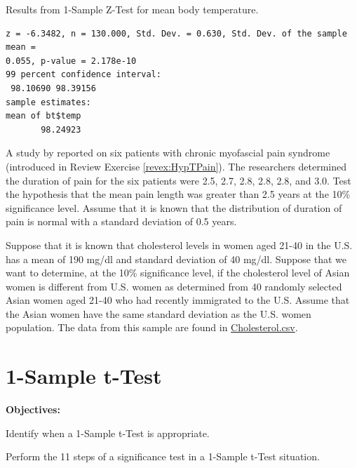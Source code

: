 \documentclass[10pt,openany]{book}\usepackage[]{graphicx}\usepackage[]{color}
\makeatletter
\newenvironment{kframe}{%
 \def\at@end@of@kframe{}%
 \ifinner\ifhmode%
  \def\at@end@of@kframe{\end{minipage}}%
  \begin{minipage}{\columnwidth}%
 \fi\fi%
 \def\FrameCommand##1{\hskip\@totalleftmargin \hskip-\fboxsep
 \colorbox{shadecolor}{##1}\hskip-\fboxsep
     \hskip-\linewidth \hskip-\@totalleftmargin \hskip\columnwidth}%
 \MakeFramed {\advance\hsize-\width
   \@totalleftmargin\z@ \linewidth\hsize
   \@setminipage}}%
 {\par\unskip\endMakeFramed%
 \at@end@of@kframe}
\newenvironment{knitrout}{}{} %
\makeatother
\begin{document}
\begin{table}[htbp]
  \caption{Results from 1-Sample Z-Test for mean body temperature.}
  \label{tab:1Zbtex}
\begin{knitrout}
\color{fgcolor}\begin{kframe}
\begin{verbatim}
z = -6.3482, n = 130.000, Std. Dev. = 0.630, Std. Dev. of the sample mean =
0.055, p-value = 2.178e-10
99 percent confidence interval:
 98.10690 98.39156 
sample estimates:
mean of bt$temp 
       98.24923 
\end{verbatim}
\end{kframe}
\end{knitrout}
\end{table}


\begin{exsection}
  \item \label{revex:HypTestZPain} \rhw{} A study by \cite{Cheshireetal1994} reported on six patients with chronic myofascial pain syndrome (introduced in Review Exercise \ref{revex:HypTPain}).  The researchers determined the duration of pain for the six patients were 2.5, 2.7, 2.8, 2.8, 2.8, and 3.0.  Test the hypothesis that the mean pain length was greater than 2.5 years at the 10\% significance level.  Assume that it is known that the distribution of duration of pain is normal with a standard deviation of 0.5 years. 

  \item \label{revex:HypTestAsianCholest} \rhw{} Suppose that it is known that cholesterol levels in women aged 21-40 in the U.S. has a mean of 190 mg/dl and standard deviation of 40 mg/dl.  Suppose that we want to determine, at the 10\% significance level, if the cholesterol level of Asian women is different from U.S. women as determined from 40 randomly selected Asian women aged 21-40 who had recently immigrated to the U.S.  Assume that the Asian women have the same standard deviation as the U.S. women population.  The data from this sample are found in \href{https://raw.githubusercontent.com/droglenc/NCData/master/Cholesterol.csv}{Cholesterol.csv}.  
\end{exsection}



\chapter{1-Sample t-Test} \label{chap:tTest1}
\begin{ChapObj}{\boxwidth}
  \textbf{Objectives:}
  \begin{Enumerate}
    \item Identify when a 1-Sample t-Test is appropriate.
    \item Perform the 11 steps of a significance test in a 1-Sample t-Test situation.
  \end{Enumerate}
\end{ChapObj}
\end{document}
